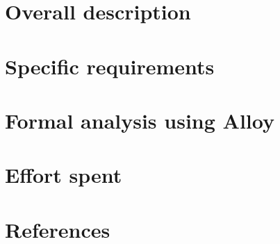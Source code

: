 \documentclass[11pt]{article}
\begin{document}
\clearpage
\section{Overall description}


\clearpage
\section{Specific requirements}


\clearpage
\section{Formal analysis using Alloy}

%

\clearpage
\section{Effort spent}


\clearpage
\section{References}
%
\end{document}
